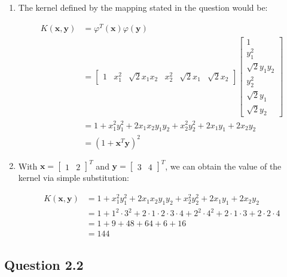 \documentclass[11pt,fancychapters]{article}
\begin{document}
\begin{enumerate}[label=\textbf{\alph*)}]
	
\item The kernel defined by the mapping stated in the question would be:

\begin{equation*}
	\begin{split}
	K(\mathbf{x},\mathbf{y}) & = \varphi^T(\mathbf{x}) \varphi(\mathbf{y}) \\
	       & = \begin{bmatrix}1 & x_1^2 & \sqrt{2}x_1x_2 & x_2^2 & \sqrt{2}x_1 & \sqrt{2}x_2\end{bmatrix} \begin{bmatrix}1 \\ y_1^2 \\ \sqrt{2}y_1y_2 \\ y_2^2 \\ \sqrt{2}y_1 \\ \sqrt{2}y_2\end{bmatrix} \\
	       & = 1 + x_1^2y_1^2 + 2x_1x_2y_1y_2 + x_2^2y_2^2 + 2x_1y_1 + 2x_2y_2 \\
	       & = \left( 1 + \mathbf{x}^T \mathbf{y} \right)^2
	\end{split}
\end{equation*}

\item With $\mathbf{x} = \begin{bmatrix}1 & 2\end{bmatrix}^T$ and $\mathbf{y} = \begin{bmatrix}3 & 4\end{bmatrix}^T$, we can obtain the value of the kernel via simple substitution:

\begin{equation*}
	\begin{split}
	K(\mathbf{x},\mathbf{y}) & = 1 + x_1^2y_1^2 + 2x_1x_2y_1y_2 + x_2^2y_2^2 + 2x_1y_1 + 2x_2y_2 \\
	       & = 1 + 1^2\cdot3^2 + 2\cdot1\cdot2\cdot3\cdot4 + 2^2\cdot4^2 + 2\cdot1\cdot3 + 2\cdot2\cdot4 \\
	       & = 1 + 9 + 48 + 64 + 6 + 16 \\
	       & = 144
	\end{split}
\end{equation*}

\end{enumerate}

\subsection*{Question 2.2}
\end{document}
